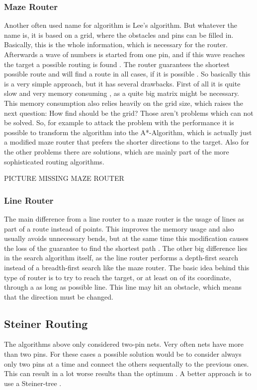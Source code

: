 \subsubsection{Maze Router}
Another often used name for algorithm is Lee's algorithm. But whatever the name is, it is based on a grid, where the obstacles and pins can be filled in. Basically, this is the whole information, which is necessary for the router. Afterwards a wave of numbers is started from one pin, and if this wave reaches the target a possible routing is found . The router guarantees the shortest possible route and will find a route in all cases, if it is possible \cite[p. 693]{kaufmann:electronic_design_automation}. So basically this is a very simple approach, but it has several drawbacks. First of all it is quite slow and very memory consuming \cite[p. 693]{kaufmann:electronic_design_automation}, as a quite big matrix might be necessary. This memory consumption also relies heavily on the grid size, which raises the next question: How find should be the grid? Those aren't problems which can not be solved. So, for example to attack the problem with the performance it is possible to transform the algorithm into the A*-Algorithm, which is actually just a modified maze router that prefers the shorter directions to the target. Also for the other problems there are solutions, which are mainly part of the more sophisticated routing algorithms.

PICTURE MISSING MAZE ROUTER

\subsubsection{Line Router}
The main difference from a line router to a maze router is the usage of lines as part of a route instead of points. This improves the memory usage and also usually avoids unnecessary bends, but at the same time this modification causes the loss of the guarantee to find the shortest path \cite[p. 695]{kaufmann:electronic_design_automation}. The other big difference lies in the search algorithm itself, as the line router performs a depth-first search instead of a breadth-first search like the maze router. The basic idea behind this type of router is to try to reach the target, or at least on of its coordinate, through a as long as possible line. This line may hit an obstacle, which means that the direction must be changed.

\subsection{Steiner Routing}
The algorithms above only considered two-pin nets. Very often nets have more than two pins. For these cases a possible solution would be to consider always only two pins at a time and connect the others sequentally to the previous ones. This can result in a lot worse results than the optimum \cite[p. 701]{kaufmann:electronic_design_automation}. A better approach is to use a Steiner-tree \cite[page 153]{springer:eda_analog_routing}.

